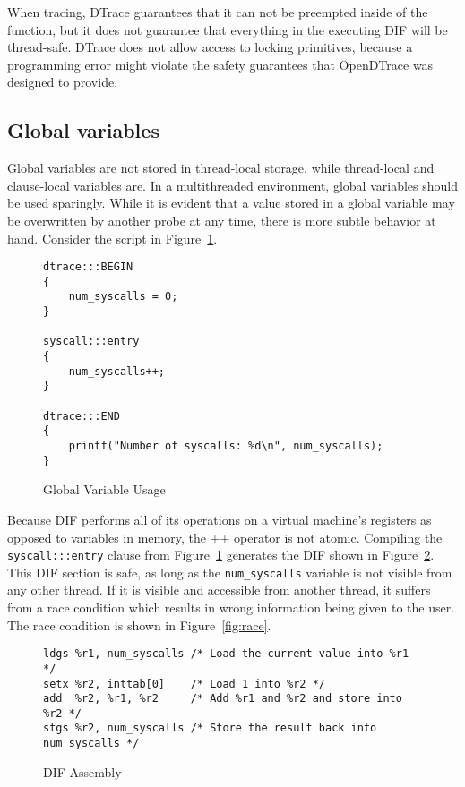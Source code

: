 When tracing, DTrace guarantees that it can not be preempted inside of
the  function, but it does not guarantee that
everything in the executing DIF will be thread-safe. DTrace does not
allow access to locking primitives, because a programming error might
violate the safety guarantees that OpenDTrace was designed to provide.

\subsection{Global variables}

Global variables are not stored in thread-local storage, while
thread-local and clause-local variables are. In a multithreaded
environment, global variables should be used sparingly. While it is
evident that a value stored in a global variable may be overwritten by
another probe at any time, there is more subtle behavior at
hand. Consider the script in Figure~\ref{fig:global-var-usage}. \newline

\begin{figure}
  \begin{lstlisting}
dtrace:::BEGIN
{
    num_syscalls = 0;
}

syscall:::entry
{
    num_syscalls++;
}
    
dtrace:::END
{
    printf("Number of syscalls: %d\n", num_syscalls);
}
  \end{lstlisting}
  \caption{Global Variable Usage}
  \label{fig:global-var-usage}
\end{figure}

\noindent
Because DIF performs all of its operations on a virtual machine's
registers as opposed to variables in memory, the ++ operator is not
atomic. Compiling the \texttt{syscall:::entry} clause from
Figure~\ref{fig:global-var-usage} generates the DIF shown in
Figure~\ref{fig:dif-asm}.  This DIF section is safe, as long as the
\texttt{num\_syscalls} variable is not visible from any other thread. If it is
visible and accessible from another thread, it suffers from a race
condition which results in wrong information being given to the
user. The race condition is shown in Figure~\ref{fig:race}. \newline

\begin{figure}
\begin{lstlisting}
ldgs %r1, num_syscalls /* Load the current value into %r1 */
setx %r2, inttab[0]    /* Load 1 into %r2 */
add  %r2, %r1, %r2     /* Add %r1 and %r2 and store into %r2 */
stgs %r2, num_syscalls /* Store the result back into num_syscalls */
\end{lstlisting}
\caption{DIF Assembly}
  \label{fig:dif-asm}
\end{figure}

